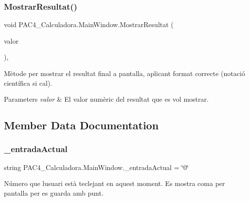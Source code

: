\subsubsection{\texorpdfstring{Mostrar\+Resultat()}{MostrarResultat()}}
{\footnotesize\ttfamily void P\+A\+C4\+\_\+\+Calculadora.\+Main\+Window.\+Mostrar\+Resultat (\begin{DoxyParamCaption}\item[{double}]{valor }\end{DoxyParamCaption})\hspace{0.3cm}{\ttfamily [inline]}, {\ttfamily [private]}}



Mètode per mostrar el resultat final a pantalla, aplicant format correcte (notació científica si cal). 


\begin{DoxyParams}{Parameters}
{\em valor} & El valor numèric del resultat que es vol mostrar.\\
\hline
\end{DoxyParams}


\subsection{Member Data Documentation}
\mbox{\label{class_p_a_c4___calculadora_1_1_main_window_a73e58986923c484ea3ac05d2d6d71915}} 
\subsubsection{\texorpdfstring{\+\_\+entrada\+Actual}{\_entradaActual}}
{\footnotesize\ttfamily string P\+A\+C4\+\_\+\+Calculadora.\+Main\+Window.\+\_\+entrada\+Actual = \char`\"{}0\char`\"{}\hspace{0.3cm}{\ttfamily [private]}}



Número que l\textquotesingle{}usuari està teclejant en aquest moment. Es mostra coma per pantalla per es guarda amb punt. 

\mbox{\label{class_p_a_c4___calculadora_1_1_main_window_ac3beb81b14960e319ce0b1cea97c9b36}} 
